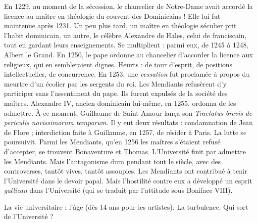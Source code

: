 \documentclass[french,twoside]{book} %
\begin{document}
\label{p118} En 1229, au moment de la sécession, le chancelier de Notre-Dame avait accordé la licence au maître en théologie du couvent des Dominicains ! Elle lui fut maintenue après 1231. Un peu plus tard, un maître en théologie séculier prit l’habit dominicain, un autre, le célèbre Alexandre de Hales, celui de franciscain, tout en gardant leurs enseignements. Se multiplient : parmi eux, de 1245 à 1248, Albert le Grand. En 1250, le pape ordonne au chancelier d’accorder la licence aux religieux, qui en sembleraient dignes. Heurts : de tour d’esprit, de positions intellectuelles, de concurrence. En 1253, une \emph{cessation} fut proclamée à propos du meurtre d’un écolier par les sergents du roi. Les Mendiants refusèrent d’y participer sans l’assentiment du pape. Ils furent expulsés de la société des maîtres. Alexandre IV, ancien dominicain lui-même, en 1255, ordonna de les admettre. À ce moment, Guillaume de Saint-Amour lança son {\itshape Tractatus brevis de periculis novissimorum temporum.} Il y eut deux résultats : condamnation de Jean de Flore ; interdiction faite à Guillaume, en 1257, de résider à Paris. La lutte se poursuivit. Parmi les Mendiants, qu’en 1256 les maîtres s’étaient refusé d’accepter, se trouvent Bonaventure et Thomas. L’Université finit par admettre les Mendiants. Mais l’antagonisme dura pendant tout le siècle, avec des controverses, tantôt vives, tantôt assoupies. Les Mendiants ont contribué à tenir l’Université dans le devoir papal. Mais l’hostilité contre eux a développé un esprit \emph{gallican} dans l’Université (qui se traduit par l’attitude sous Boniface VIII).\par
La vie universitaire : l’âge (dès 14 ans pour les artistes). La turbulence. Qui sort de l’Université ?
\end{document}
